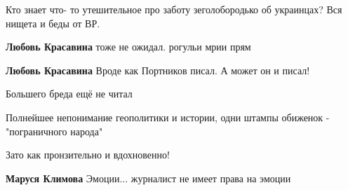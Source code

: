 \begin{itemize}
Кто знает что- то утешительное про заботу зеголобородько об украинцах? Вся
нищета и беды от ВР.

\begin{itemize}
 
\textbf{Любовь Красавина} тоже не ожидал. рогульи мрии прям

 
\textbf{Любовь Красавина} Вроде как Портников писал.
А может он и писал!
\end{itemize}

 
Большего бреда ещё не читал

 
Полнейшее непонимание геополитики и истории, одни штампы обиженок - "пограничного народа"

\begin{itemize}
 
Зато как пронзительно и вдохновенно!🤣🤣🤣

 
\textbf{Маруся Климова}
Эмоции... журналист не имеет права на эмоции

 

\end{itemize}
\end{itemize}
